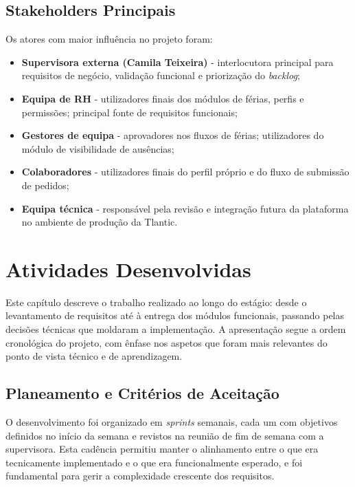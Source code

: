 \documentclass[12pt, a4paper, twoside, openright]{report}
\begin{document}
\section{Stakeholders Principais}

Os atores com maior influência no projeto foram:

\begin{itemize}
  \item \textbf{Supervisora externa (Camila Teixeira)} - interlocutora principal para
        requisitos de negócio, validação funcional e priorização do \textit{backlog};
  \item \textbf{Equipa de RH} - utilizadores finais dos módulos de férias, perfis
        e permissões; principal fonte de requisitos funcionais;
  \item \textbf{Gestores de equipa} - aprovadores nos fluxos de férias; utilizadores
        do módulo de visibilidade de ausências;
  \item \textbf{Colaboradores} - utilizadores finais do perfil próprio e do fluxo
        de submissão de pedidos;
  \item \textbf{Equipa técnica} - responsável pela revisão e integração futura
        da plataforma no ambiente de produção da Tlantic.
\end{itemize}

\chapter{Atividades Desenvolvidas}
\label{cap:atividades}

Este capítulo descreve o trabalho realizado ao longo do estágio: desde o levantamento
de requisitos até à entrega dos módulos funcionais, passando pelas decisões técnicas
que moldaram a implementação. A apresentação segue a ordem cronológica do projeto,
com ênfase nos aspetos que foram mais relevantes do ponto de vista técnico e de
aprendizagem.

\section{Planeamento e Critérios de Aceitação}

O desenvolvimento foi organizado em \textit{sprints} semanais, cada um com objetivos
definidos no início da semana e revistos na reunião de fim de semana com a supervisora.
Esta cadência permitiu manter o alinhamento entre o que era tecnicamente implementado
e o que era funcionalmente esperado, e foi fundamental para gerir a complexidade
crescente dos requisitos.
\end{document}
